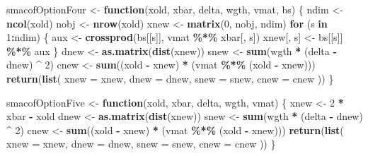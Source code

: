 \documentclass[
  12pt,
]{article}
\newenvironment{Shaded}{\begin{snugshade}}{\end{snugshade}}
\newcommand{\AttributeTok}[1]{\textcolor[rgb]{0.13,0.29,0.53}{#1}}
\newcommand{\ControlFlowTok}[1]{\textcolor[rgb]{0.13,0.29,0.53}{\textbf{#1}}}
\newcommand{\DecValTok}[1]{\textcolor[rgb]{0.00,0.00,0.81}{#1}}
\newcommand{\FunctionTok}[1]{\textcolor[rgb]{0.13,0.29,0.53}{\textbf{#1}}}
\newcommand{\NormalTok}[1]{#1}
\newcommand{\OtherTok}[1]{\textcolor[rgb]{0.56,0.35,0.01}{#1}}
\newcommand{\SpecialCharTok}[1]{\textcolor[rgb]{0.81,0.36,0.00}{\textbf{#1}}}
\begin{document}
\begin{Shaded}
\begin{Highlighting}[]
\NormalTok{smacofOptionFour }\OtherTok{\textless{}{-}} \ControlFlowTok{function}\NormalTok{(xold, xbar, delta, wgth, vmat, bs) \{}
\NormalTok{  ndim }\OtherTok{\textless{}{-}} \FunctionTok{ncol}\NormalTok{(xold)}
\NormalTok{  nobj }\OtherTok{\textless{}{-}} \FunctionTok{nrow}\NormalTok{(xold)}
\NormalTok{  xnew }\OtherTok{\textless{}{-}} \FunctionTok{matrix}\NormalTok{(}\DecValTok{0}\NormalTok{, nobj, ndim)}
  \ControlFlowTok{for}\NormalTok{ (s }\ControlFlowTok{in} \DecValTok{1}\SpecialCharTok{:}\NormalTok{ndim) \{}
\NormalTok{    aux }\OtherTok{\textless{}{-}} \FunctionTok{crossprod}\NormalTok{(bs[[s]], vmat }\SpecialCharTok{\%*\%}\NormalTok{ xbar[, s])}
\NormalTok{    xnew[, s] }\OtherTok{\textless{}{-}}\NormalTok{ bs[[s]] }\SpecialCharTok{\%*\%}\NormalTok{ aux}
\NormalTok{  \}}
\NormalTok{  dnew }\OtherTok{\textless{}{-}} \FunctionTok{as.matrix}\NormalTok{(}\FunctionTok{dist}\NormalTok{(xnew))}
\NormalTok{  snew }\OtherTok{\textless{}{-}} \FunctionTok{sum}\NormalTok{(wgth }\SpecialCharTok{*}\NormalTok{ (delta }\SpecialCharTok{{-}}\NormalTok{ dnew) }\SpecialCharTok{\^{}} \DecValTok{2}\NormalTok{)}
\NormalTok{  cnew }\OtherTok{\textless{}{-}} \FunctionTok{sum}\NormalTok{((xold }\SpecialCharTok{{-}}\NormalTok{ xnew) }\SpecialCharTok{*}\NormalTok{ (vmat }\SpecialCharTok{\%*\%}\NormalTok{ (xold }\SpecialCharTok{{-}}\NormalTok{ xnew)))}
  \FunctionTok{return}\NormalTok{(}\FunctionTok{list}\NormalTok{(}
    \AttributeTok{xnew =}\NormalTok{ xnew,}
    \AttributeTok{dnew =}\NormalTok{ dnew,}
    \AttributeTok{snew =}\NormalTok{ snew,}
    \AttributeTok{cnew =}\NormalTok{ cnew}
\NormalTok{  ))}
\NormalTok{\}}

\NormalTok{smacofOptionFive }\OtherTok{\textless{}{-}} \ControlFlowTok{function}\NormalTok{(xold, xbar, delta, wgth, vmat) \{}
\NormalTok{  xnew }\OtherTok{\textless{}{-}} \DecValTok{2} \SpecialCharTok{*}\NormalTok{ xbar }\SpecialCharTok{{-}}\NormalTok{ xold}
\NormalTok{  dnew }\OtherTok{\textless{}{-}} \FunctionTok{as.matrix}\NormalTok{(}\FunctionTok{dist}\NormalTok{(xnew))}
\NormalTok{  snew }\OtherTok{\textless{}{-}} \FunctionTok{sum}\NormalTok{(wgth }\SpecialCharTok{*}\NormalTok{ (delta }\SpecialCharTok{{-}}\NormalTok{ dnew) }\SpecialCharTok{\^{}} \DecValTok{2}\NormalTok{)}
\NormalTok{  cnew }\OtherTok{\textless{}{-}} \FunctionTok{sum}\NormalTok{((xold }\SpecialCharTok{{-}}\NormalTok{ xnew) }\SpecialCharTok{*}\NormalTok{ (vmat }\SpecialCharTok{\%*\%}\NormalTok{ (xold }\SpecialCharTok{{-}}\NormalTok{ xnew)))}
  \FunctionTok{return}\NormalTok{(}\FunctionTok{list}\NormalTok{(}
    \AttributeTok{xnew =}\NormalTok{ xnew,}
    \AttributeTok{dnew =}\NormalTok{ dnew,}
    \AttributeTok{snew =}\NormalTok{ snew,}
    \AttributeTok{cnew =}\NormalTok{ cnew}
\NormalTok{  ))}
\NormalTok{\}}


\end{Highlighting}
\end{Shaded}
\end{document}
